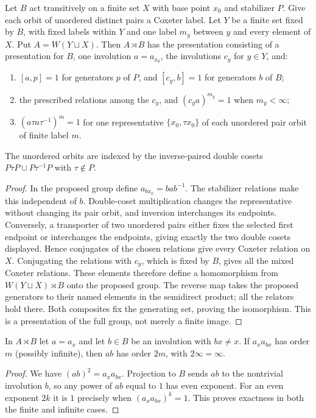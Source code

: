 \begin{proposition}\label{O-prop:orbital}
Let $B$ act transitively on a finite set $X$ with base point $x_0$ and stabilizer $P$. Give each orbit of unordered distinct pairs a Coxeter label. Let $Y$ be a finite set fixed by $B$, with fixed labels within $Y$ and one label $m_y$ between $y$ and every element of $X$. Put $A=W(Y\sqcup X)$. Then $A\rtimes B$ has the presentation consisting of a presentation for $B$, one involution $a=a_{x_0}$, the involutions $c_y$ for $y\in Y$, and:
\begin{enumerate}
\item $[a,p]=1$ for generators $p$ of $P$, and $[c_y,b]=1$ for generators $b$ of $B$;
\item the prescribed relations among the $c_y$, and $(c_ya)^{m_y}=1$ when $m_y<\infty$;
\item $(a\tau a\tau^{-1})^{m}=1$ for one representative $\{x_0,\tau x_0\}$ of each unordered pair orbit of finite label $m$.
\end{enumerate}
The unordered orbits are indexed by the inverse-paired double cosets $P\tau P\cup P\tau^{-1}P$ with $\tau\notin P$.
\end{proposition}
\begin{proof}
In the proposed group define $a_{bx_0}=bab^{-1}$. The stabilizer relations make this independent of $b$. Double-coset multiplication changes the representative without changing its pair orbit, and inversion interchanges its endpoints. Conversely, a transporter of two unordered pairs either fixes the selected first endpoint or interchanges the endpoints, giving exactly the two double cosets displayed. Hence conjugates of the chosen relations give every Coxeter relation on $X$. Conjugating the relations with $c_y$, which is fixed by $B$, gives all the mixed Coxeter relations. These elements therefore define a homomorphism from $W(Y\sqcup X)\rtimes B$ onto the proposed group. The reverse map takes the proposed generators to their named elements in the semidirect product; all the relators hold there. Both composites fix the generating set, proving the isomorphism. This is a presentation of the full group, not merely a finite image.
\end{proof}

\begin{lemma}\label{O-lem:double}
In $A\rtimes B$ let $a=a_x$ and let $b\in B$ be an involution with $bx\ne x$. If $a_xa_{bx}$ has order $m$ (possibly infinite), then $ab$ has order $2m$, with $2\infty=\infty$.
\end{lemma}
\begin{proof}
We have $(ab)^2=a_xa_{bx}$. Projection to $B$ sends $ab$ to the nontrivial involution $b$, so any power of $ab$ equal to $1$ has even exponent. For an even exponent $2k$ it is $1$ precisely when $(a_xa_{bx})^k=1$. This proves exactness in both the finite and infinite cases.
\end{proof}


